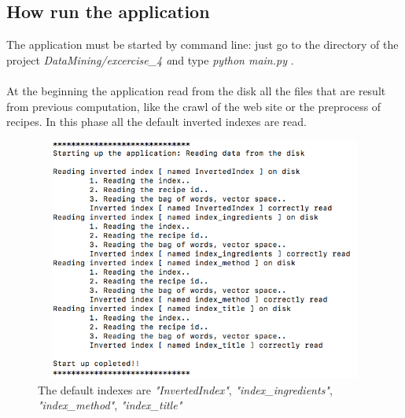 \documentclass[oneside]{article}			%
\begin{document}
	\clearpage
	\subsection{How run the application}
		The application must be started by command line: just go to the directory of the project \textit{DataMining/excercise\_4 a}nd type \textit{python main.py} .
		\\\\
		At the beginning the application read from the disk all the files that are result from previous computation, like the crawl of the web site or the preprocess of recipes. In this phase all the default inverted indexes are read.
		\begin{figure}[h]
			\includegraphics[width=12cm, height=8cm]{./report_file/app/startup.png}\caption{The default indexes are \textit{"InvertedIndex"}, \textit{"index\_ingredients"}, \textit{"index\_method"}, \textit{"index\_title"}}
		\end{figure}
\end{document}
